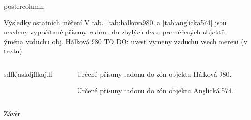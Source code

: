 \documentclass{beamer}
\begin{document}
\begin{frame}
\begin{columns}
\begin{column}{.57\textwidth}
\begin{beamercolorbox}[center]{postercolumn}
\begin{minipage}{.98\textwidth}
{\begin{myblock}{Výsledky ostatních měření}
    V tab.~\ref{tab:halkova980} a \ref{tab:anglicka574} jsou uvedeny vypočítané přísuny radonu do zbylých dvou proměřených objektů. ýměna vzduchu obj. Hálková 980 
TO DO: uvest vymeny vzduchu vsech mereni (v textu)
\begin{columns}
    \begin{column}{.5\textwidth}
        sdfkjaskdjflkajdf
    \end{column}
    \begin{column}{.5\textwidth}
        \begin{table}
            \centering
            \scriptsize
            \caption{Určené přísuny radonu do zón objektu Hálková 980.}
            \label{tab:halkova980}
            
        \end{table}
        \begin{table}
            \centering
            \scriptsize
            \caption{Určené přísuny radonu do zón objektu Anglická 574.}
            \label{tab:anglicka574}
            
        \end{table}
    \end{column}
\end{columns}
\end{myblock}\vfill

\begin{myblock}{Závěr}
    
\end{myblock}
\vfill

}
\end{minipage}
\end{beamercolorbox}
\end{column}
\end{columns}
\end{frame}
\end{document}

